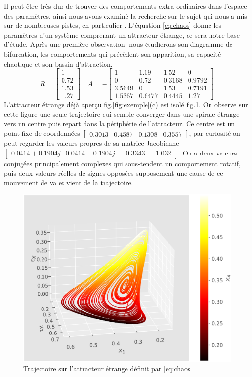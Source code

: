 \documentclass{wsdcr}
\begin{document}
Il peut être très dur de trouver des comportements extra-ordinaires dans l'espace des paramètres, ainsi nous avons examiné la recherche sur le sujet qui nous a mis sur de nombreuses pistes, en particulier \cite{vano2006}. L'équation \ref{eq:chaos} donne les paramètres d'un système comprenant un attracteur étrange, ce sera notre base d'étude. Après une première observation, nous étudierons son diagramme de bifurcation, les comportements qui précèdent son apparition, sa capacité chaotique et son bassin d'attraction. 
\begin{equation}
R={\begin{bmatrix}1\\0.72\\1.53\\1.27\end{bmatrix}}\quad A =-{\begin{bmatrix}1&1.09&1.52&0\\0&0.72&0.3168&0.9792\\3.5649&0&1.53&0.7191\\1.5367&0.6477&0.4445&1.27\end{bmatrix}}
\label{eq:chaos}
\end{equation}
L'attracteur étrange déjà aperçu fig.\ref{fig:exemple}(c) est isolé fig.\ref{fig:ae4}. On observe sur cette figure une seule trajectoire qui semble converger dans une spirale étrange vers un centre puis repart dans la périphérie de l'attracteur. Ce centre est un point fixe de coordonnées $\begin{bmatrix}0.3013&0.4587&0.1308&0.3557\end{bmatrix}$, par curiosité on peut regarder les valeurs propres de sa matrice Jacobienne $\begin{bmatrix}0.0414+0.1904j&0.0414-0.1904j&-0.3343&-1.032\end{bmatrix}$. On a deux valeurs conjugées principalement complexes qui sous-tendent un comportement rotatif, puis deux valeurs réelles de signes opposées supposement une cause de ce mouvement de va et vient de la trajectoire. 
\begin{figure}
    \centering
    \includegraphics[width=\linewidth]{fig/lv4_ae4.png}
    \caption{Trajectoire sur l'attracteur étrange définit par \ref{eq:chaos}}
    \label{fig:ae4}
\end{figure}
\end{document}
